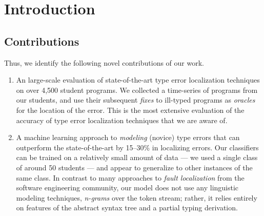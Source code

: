 \section{Introduction}
\label{sec:introduction}

\subsection{Contributions}
\label{sec:contributions}
Thus, we identify the following novel contributions of our work.
%
\begin{enumerate}
\item An large-scale evaluation of state-of-the-art type error
  localization techniques on over 4,500 student programs.
  We collected a time-series of \ocaml programs from our students, and
  use their subsequent \emph{fixes} to ill-typed programs as
  \emph{oracles} for the location of the error.
  This is the most extensive evaluation of the accuracy of type error
  localization techniques that we are aware of.
\item A machine learning approach to \emph{modeling} (novice) type
  errors that can outperform the state-of-the-art by 15--30\% in
  localizing errors.
  Our classifiers can be trained on a relatively small amount of data --- we
  used a single class of around 50 students --- and appear to
  generalize to other instances of the same class.
  In contrast to many approaches to \emph{fault localization} from the
  software engineering community, our model does not use any linguistic
  modeling techniques, \eg \emph{n-grams} over the token stream; rather,
  it relies entirely on features of the abstract syntax tree and a
  partial typing derivation.
\end{enumerate}

